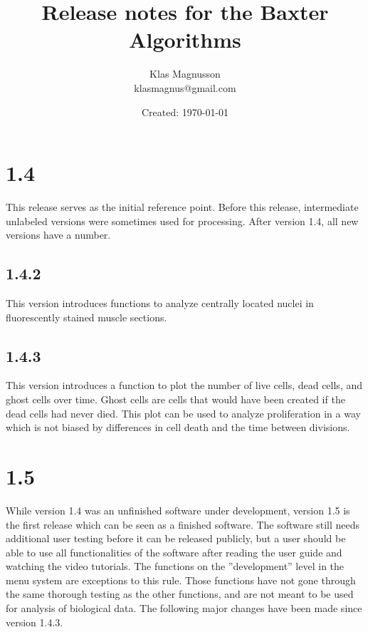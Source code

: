 \documentclass[a4paper, oneside, onecolumn, 11pt]{article}
\title{Release notes for the Baxter Algorithms}
\author{Klas Magnusson \\ klasmagnus@gmail.com}
\date{Created: \today}
\begin{document}
\maketitle

\section*{1.4}
This release serves as the initial reference point. Before this release, intermediate unlabeled versions were sometimes used for processing. After version 1.4, all new versions have a number.

\subsection*{1.4.2}
This version introduces functions to analyze centrally located nuclei in fluorescently stained muscle sections.

\subsection*{1.4.3}
This version introduces a function to plot the number of live cells, dead cells, and ghost cells over time. Ghost cells are cells that would have been created if the dead cells had never died. This plot can be used to analyze proliferation in a way which is not biased by differences in cell death and the time between divisions.

\section*{1.5}
While version 1.4 was an unfinished software under development, version 1.5 is the first release which can be seen as a finished software. The software still needs additional user testing before it can be released publicly, but a user should be able to use all functionalities of the software after reading the user guide and watching the video tutorials. The functions on the ''development'' level in the menu system are exceptions to this rule. Those functions have not gone through the same thorough testing as the other functions, and are not meant to be used for analysis of biological data. The following major changes have been made since version 1.4.3.
\end{document}
